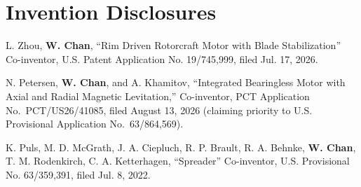 \section{\sc Invention Disclosures}

\begin{description}[font=\normalfont, labelwidth=1.5em, leftmargin=2em, itemsep=0.5em]

\item[I3] L. Zhou, \textbf{W. Chan},  ``Rim Driven Rotorcraft Motor with Blade Stabilization''
Co-inventor, U.S. Patent Application No. 19/745,999,  filed Jul. 17, 2026. 

\item[I2] N. Petersen, \textbf{W. Chan}, and A. Khamitov, ``Integrated Bearingless Motor with Axial and Radial Magnetic Levitation,''
Co-inventor, PCT Application No.\ PCT/US26/41085, filed August 13, 2026 (claiming priority to U.S. Provisional Application No.\ 63/864,569). 

\item[I1] K. Puls, M. D. McGrath, J. A. Ciepluch, R. P. Brault, R. A. Behnke, \textbf{W. Chan}, T. M. Rodenkirch, C. A. Ketterhagen, ``Spreader''
Co-inventor, U.S. Provisional No. 63/359,391, filed Jul. 8, 2022.
\end{description}

\endinput
